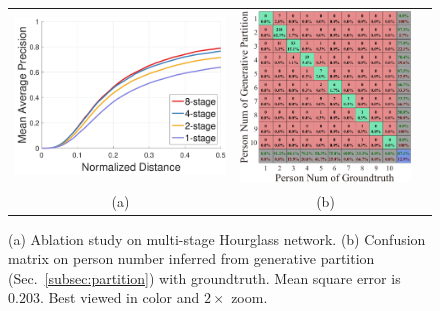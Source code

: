 \documentclass[10pt,twocolumn,letterpaper]{article}
\begin{document}
\begin{figure}[t!]
\begin{center}
\setlength{\tabcolsep}{3.5pt}
\begin{tabular}{ccc}
\includegraphics[scale=0.21]{figs/multi_stage_ablation_exp.pdf} & \includegraphics[scale=0.26]{figs/Confusion_Matrix.pdf} \\
{\fontsize{9pt}{9pt} \selectfont (a) } & {\fontsize{9pt}{9pt} \selectfont (b) } \\
\end{tabular}
\caption{(a) Ablation study on multi-stage Hourglass network. (b) Confusion matrix on person number inferred from generative partition (Sec.~\ref{subsec:partition}) with groundtruth. Mean square error is $0.203$. Best viewed in color and $2\times$ zoom.}
\label{fig:other_ablation_exp}
\vspace{-15pt}
\end{center}
\end{figure}
\end{document}
